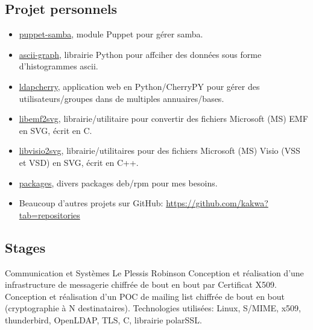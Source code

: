 \documentclass[10pt,a4paper,sans]{moderncv}        %
\begin{document}
\subsection{Projet personnels}
              {}
              {}
              {}
              {
              \begin{itemize}
              \item \href{https://github.com/kakwa/puppet-samba}{puppet-samba}, module Puppet pour gérer samba.
              \item \href{https://github.com/kakwa/py-ascii-graph}{ascii-graph}, librairie Python pour affciher des données sous forme d'histogrammes ascii.
              \item \href{https://github.com/kakwa/ldapcherry}{ldapcherry}, application web en Python/CherryPY pour gérer des utilisateurs/groupes dans de multiples annuaires/bases.
              \item \href{https://github.com/kakwa/libemf2svg}{libemf2svg}, librairie/utilitaire pour convertir des fichiers Microsoft (MS) EMF en SVG, écrit en C.
              \item \href{https://github.com/kakwa/libvisio2svg}{libvisio2svg}, librairie/utilitaires pour des fichiers Microsoft (MS) Visio (VSS et VSD) en SVG, écrit en C++.
              \item \href{https://github.com/kakwa/packages}{packages}, divers packages deb/rpm pour mes besoins.
              \item Beaucoup d'autres projets sur GitHub: \url{https://github.com/kakwa?tab=repositories}
              \end{itemize}
}

\subsection{Stages}

              {Communication et Systèmes}
              {Le Plessis Robinson}
              {}
              {Conception et réalisation d'une infrastructure de messagerie chiffrée de bout en bout par
               Certificat X509. Conception et réalisation d'un POC de mailing list chiffrée de bout en bout
               (cryptographie à N destinataires).
               \newline Technologies utilisées: Linux, S/MIME, x509, thunderbird, OpenLDAP, TLS, C, librairie polarSSL.
              }
\end{document}
